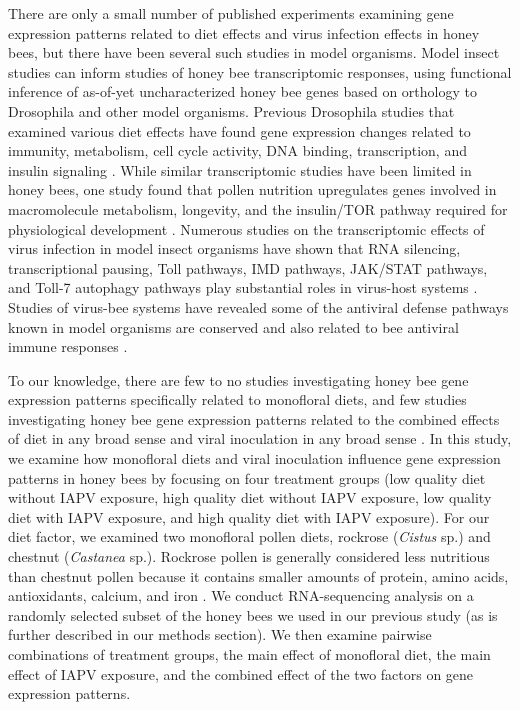 \documentclass{bmcart}
\begin{document}
\begin{linenumbers}
\begin{doublespacing}
There are only a small number of published experiments examining gene expression patterns related to diet effects \cite{alaux2} and virus infection effects \cite{galbraith} in honey bees, but there have been several such studies in model organisms. Model insect studies can inform studies of honey bee transcriptomic responses, using functional inference of as-of-yet uncharacterized honey bee genes based on orthology to Drosophila and other model organisms. Previous Drosophila studies that examined various diet effects have found gene expression changes related to immunity, metabolism, cell cycle activity, DNA binding, transcription, and insulin signaling \cite{sugarFat, sugarProtein, jHormone, alaux2}. While similar transcriptomic studies have been limited in honey bees, one study found that pollen nutrition upregulates genes involved in macromolecule metabolism, longevity, and the insulin/TOR pathway required for physiological development \cite{alaux2}. Numerous studies on the transcriptomic effects of virus infection in model insect organisms have shown that RNA silencing, transcriptional pausing, Toll pathways, IMD pathways, JAK/STAT pathways, and Toll-7 autophagy pathways play substantial roles in virus-host systems \cite{cherryReview, swevers}. Studies of virus-bee systems have revealed some of the antiviral defense pathways known in model organisms are conserved and also related to bee antiviral immune responses \cite{McMenamin}.

To our knowledge, there are few to no studies investigating honey bee gene expression patterns specifically related to monofloral diets, and few studies investigating honey bee gene expression patterns related to the combined effects of diet in any broad sense and viral inoculation in any broad sense \cite{interactingDV}. In this study, we examine how monofloral diets and viral inoculation influence gene expression patterns in honey bees by focusing on four treatment groups (low quality diet without IAPV exposure, high quality diet without IAPV exposure, low quality diet with IAPV exposure, and high quality diet with IAPV exposure). For our diet factor, we examined two monofloral pollen diets, rockrose (\textit{Cistus} sp.) and chestnut (\textit{Castanea} sp.). Rockrose pollen is generally considered less nutritious than chestnut pollen because it contains smaller amounts of protein, amino acids, antioxidants, calcium, and iron \cite{adamInt, DiPasquale}. We conduct RNA-sequencing analysis on a randomly selected subset of the honey bees we used in our previous study (as is further described in our methods section). We then examine pairwise combinations of treatment groups, the main effect of monofloral diet, the main effect of IAPV exposure, and the combined effect of the two factors on gene expression patterns.


\end{doublespacing}
\end{linenumbers}
\end{document}
